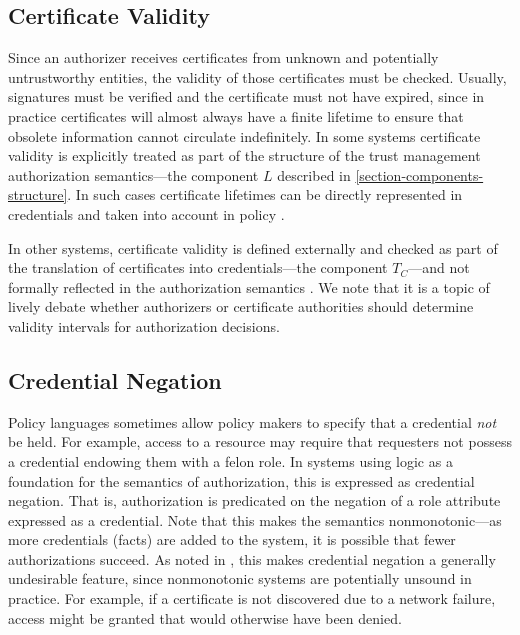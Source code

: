 \subsection{Certificate Validity}

Since an authorizer receives certificates from unknown and potentially untrustworthy entities,
the validity of those certificates must be checked. Usually, signatures must be verified and the
certificate must not have expired, since in practice certificates will almost always have a
finite lifetime to ensure that obsolete information cannot circulate indefinitely. In some
systems certificate validity is explicitly treated as part of the structure of the trust
management authorization semantics---the component $L$ described in
\autoref{section-components-structure}. In such cases certificate lifetimes can be directly
represented in credentials and taken into account in policy
\cite{Bauer:GFACSW,lbi-fc01,skalka-wang-chapin-jcs06}.

In other systems, certificate validity is defined externally and checked as part of the
translation of certificates into credentials---the component $T_C$---and not formally reflected
in the authorization semantics \cite{RFC-2693}. We note that it is a topic of lively debate
whether authorizers \cite{Rivest:CWECRL} or certificate authorities \cite{McDaniel:RTCWECRL}
should determine validity intervals for authorization decisions.

\subsection{Credential Negation}

Policy languages sometimes allow policy makers to specify that a credential \emph{not} be held.
For example, access to a resource may require that requesters not possess a credential endowing
them with a felon role. In systems using logic as a foundation for the semantics of
authorization, this is expressed as credential negation. That is, authorization is predicated on
the negation of a role attribute expressed as a credential. Note that this makes the semantics
nonmonotonic---as more credentials (facts) are added to the system, it is possible that fewer
authorizations succeed. As noted in \cite{seamons-policy02}, this makes credential negation a
generally undesirable feature, since nonmonotonic systems are potentially unsound in practice.
For example, if a certificate is not discovered due to a network failure, access might be
granted that would otherwise have been denied.

